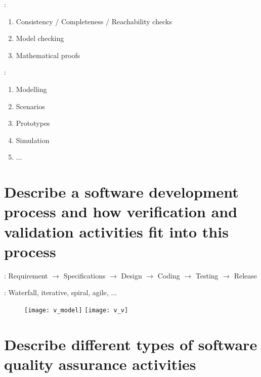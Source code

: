 \begin{minipage}[t]{0.48\textwidth}
     :
    \begin{enumerate}
        \item Consistency / Completeness / Reachability checks
        \item Model checking
        \item Mathematical proofs
    \end{enumerate}
\end{minipage}
\hfill
\begin{minipage}[t]{0.48\textwidth}
     :
    \begin{enumerate}
        \item Modelling
        \item Scenarios
        \item Prototypes
        \item Simulation
        \item[] ...
    \end{enumerate}
\end{minipage}

\section{Describe a software development process and how verification and validation activities fit into this process}

 : Requirement $\rightarrow$ Specifications $\rightarrow$ Design $\rightarrow$ Coding $\rightarrow$ Testing $\rightarrow$ Release

 : Waterfall, iterative, spiral, agile, ...

\begin{figure}[H]
    \centering
    \texttt{[image: v\_model]}\hfill
    \texttt{[image: v\_v]}
\end{figure}

\newpage
\section{Describe different types of software quality assurance activities}

